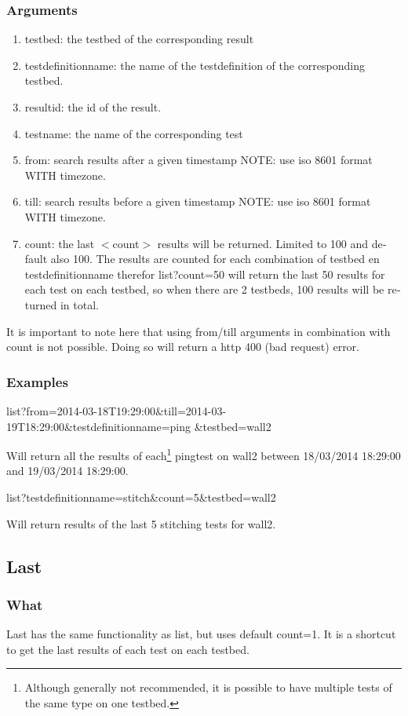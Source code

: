 \begin{otherlanguage}{english}
\subsubsection{Arguments}
\begin{enumerate}
\item testbed: the testbed of the corresponding result
\item testdefinitionname: the name of the testdefinition of the corresponding testbed.
\item resultid: the id of the result.
\item testname: the name of the corresponding test
\item from: search results after a given timestamp NOTE: use iso 8601 format WITH timezone.
\item till: search results before a given timestamp NOTE: use iso 8601 format WITH timezone.
\item count: the last $<$count$>$ results will be returned. Limited to 100 and default also 100. The results are counted for each combination of testbed en testdefinitionname therefor list?count=50 will return the last 50 results for each test on each testbed, so when there are 2 testbeds, 100 results will be returned in total.
\end{enumerate}
\npar
It is important to note here that using from/till arguments in combination with count is not possible. Doing so will return a http 400 (bad request) error.
\subsubsection{Examples}
\begin{lt}
list?from=2014-03-18T19:29:00\&till=2014-03-19T18:29:00\&testdefinitionname=ping
&testbed=wall2
\end{lt}
Will return all the results of each\footnote{Although generally not recommended, it is possible to have multiple tests of the same type on one testbed.} pingtest on wall2 between 18/03/2014 18:29:00 and 19/03/2014 18:29:00.
\npar
\begin{lt}
list?testdefinitionname=stitch\&count=5\&testbed=wall2
\end{lt}
Will return results of the last 5 stitching tests for wall2.

\clearpage

\subsection{Last}
\subsubsection{What}
Last has the same functionality as list, but uses default count=1. It is a shortcut to get the last results of each test on each testbed.

\end{otherlanguage}
